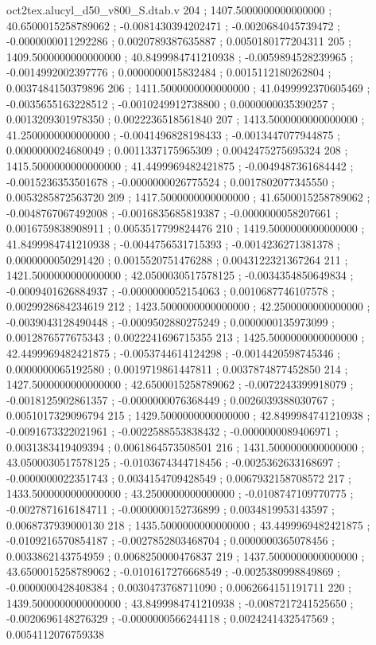 \begin{filecontents}[overwrite]{oct2tex.alucyl_d50_v800_S.dtab.v}
204 ; 1407.5000000000000000 ; 40.6500015258789062 ; -0.0081430394202471 ; -0.0020684045739472 ; -0.0000000011292286 ; 0.0020789387635887 ; 0.0050180177204311
205 ; 1409.5000000000000000 ; 40.8499984741210938 ; -0.0059894528239965 ; -0.0014992002397776 ; 0.0000000015832484 ; 0.0015112180262804 ; 0.0037484150379896
206 ; 1411.5000000000000000 ; 41.0499992370605469 ; -0.0035655163228512 ; -0.0010249912738800 ; 0.0000000035390257 ; 0.0013209301978350 ; 0.0022236518561840
207 ; 1413.5000000000000000 ; 41.2500000000000000 ; -0.0041496828198433 ; -0.0013447077944875 ; 0.0000000024680049 ; 0.0011337175965309 ; 0.0042475275695324
208 ; 1415.5000000000000000 ; 41.4499969482421875 ; -0.0049487361684442 ; -0.0015236353501678 ; -0.0000000026775524 ; 0.0017802077345550 ; 0.0053285872563720
209 ; 1417.5000000000000000 ; 41.6500015258789062 ; -0.0048767067492008 ; -0.0016835685819387 ; -0.0000000058207661 ; 0.0016759838908911 ; 0.0053517799824476
210 ; 1419.5000000000000000 ; 41.8499984741210938 ; -0.0044756531715393 ; -0.0014236271381378 ; 0.0000000050291420 ; 0.0015520751476288 ; 0.0043122321367264
211 ; 1421.5000000000000000 ; 42.0500030517578125 ; -0.0034354850649834 ; -0.0009401626884937 ; -0.0000000052154063 ; 0.0010687746107578 ; 0.0029928684234619
212 ; 1423.5000000000000000 ; 42.2500000000000000 ; -0.0039043128490448 ; -0.0009502880275249 ; 0.0000000135973099 ; 0.0012876577675343 ; 0.0022241696715355
213 ; 1425.5000000000000000 ; 42.4499969482421875 ; -0.0053744614124298 ; -0.0014420598745346 ; 0.0000000065192580 ; 0.0019719861447811 ; 0.0037874877452850
214 ; 1427.5000000000000000 ; 42.6500015258789062 ; -0.0072243399918079 ; -0.0018125902861357 ; -0.0000000076368449 ; 0.0026039388030767 ; 0.0051017329096794
215 ; 1429.5000000000000000 ; 42.8499984741210938 ; -0.0091673322021961 ; -0.0022588553838432 ; -0.0000000089406971 ; 0.0031383419409394 ; 0.0061864573508501
216 ; 1431.5000000000000000 ; 43.0500030517578125 ; -0.0103674344718456 ; -0.0025362633168697 ; -0.0000000022351743 ; 0.0034154709428549 ; 0.0067932158708572
217 ; 1433.5000000000000000 ; 43.2500000000000000 ; -0.0108747109770775 ; -0.0027871616184711 ; -0.0000000152736899 ; 0.0034819953143597 ; 0.0068737939000130
218 ; 1435.5000000000000000 ; 43.4499969482421875 ; -0.0109216570854187 ; -0.0027852803468704 ; 0.0000000365078456 ; 0.0033862143754959 ; 0.0068250000476837
219 ; 1437.5000000000000000 ; 43.6500015258789062 ; -0.0101617276668549 ; -0.0025380998849869 ; -0.0000000428408384 ; 0.0030473768711090 ; 0.0062664151191711
220 ; 1439.5000000000000000 ; 43.8499984741210938 ; -0.0087217241525650 ; -0.0020696148276329 ; -0.0000000566244118 ; 0.0024241432547569 ; 0.0054112076759338

\end{filecontents}
